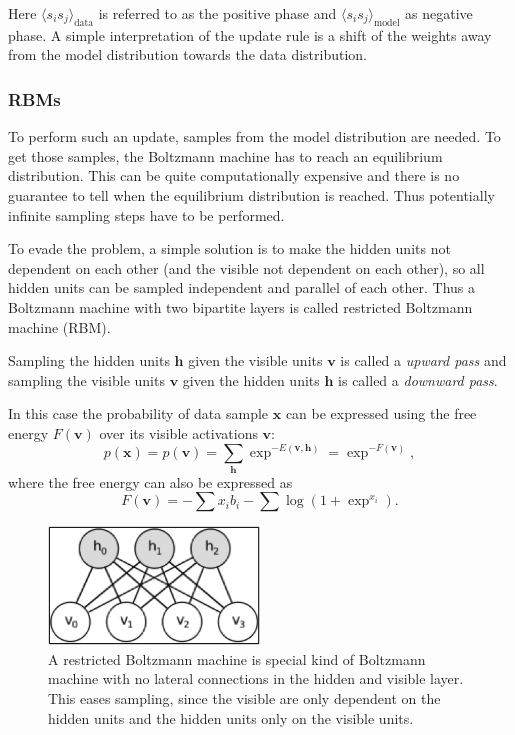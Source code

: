 Here $\langle s_i s_j \rangle_{\text{data}}$ is referred to as the positive phase and $ \langle s_i s_j \rangle_{\text{model}}$ as negative phase.
A simple interpretation of the update rule is a shift of the weights away from the model distribution towards the data distribution.

\subsubsection{RBMs}

To perform such an update, samples from the model distribution are needed. 
To get those samples, the Boltzmann machine has to reach an equilibrium distribution. 
This can be quite computationally expensive and there is no guarantee to tell when the equilibrium distribution is reached.
Thus potentially infinite sampling steps have to be performed.

To evade the problem, a simple solution is to make the hidden units not dependent on each other (and the visible not dependent on each other), so all hidden units can be sampled independent and parallel of each other.
Thus a Boltzmann machine with two bipartite layers is called restricted Boltzmann machine (RBM).

Sampling the hidden units $\textbf{h}$ given the visible units $\textbf{v}$ is called a \textit{upward pass} and sampling the visible units $\textbf{v}$ given the hidden units $\textbf{h}$ is called a \textit{downward pass}.

In this case the probability of data sample $\textbf{x}$ can be expressed using the free energy $F(\textbf{v})$ over its visible activations $\textbf{v}$:
\[
p(\textbf{x}) =  p(\textbf{v}) = \sum_{\textbf{h}} \exp^{-E(\textbf{v},\textbf{h})} = \exp^{-F(\textbf{v})},
\]
where the free energy can also be expressed as
\[
F(\textbf{v}) = - \sum x_i b_i - \sum \log(1 + \exp^{x_i})  .
\]

\begin{figure}
	\centering
    	\includegraphics[width=0.5\textwidth]{imgs/rbm.png} 
    \caption{A restricted Boltzmann machine is special kind of Boltzmann machine with no lateral connections in the hidden and visible layer. This eases sampling, since the visible are only dependent on the hidden units and the hidden units only on the visible units.}
	\label{fig:rbm}
\end{figure}

